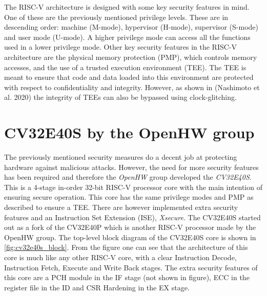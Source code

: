 The RISC-V architecture is designed with some key security features in mind. One of these are the previously mentioned privilege levels. These are in descending order: machine (M-mode), hypervisor (H-mode), supervisor (S-mode) and user mode (U-mode). A higher privilege mode can access all the functions used in a lower privilege mode\cite{source2}. Other key security features in the RISC-V architecture are the physical memory protection (PMP), which controls memory accesses, and the use of a trusted execution environment (TEE). The TEE is meant to ensure that code and data loaded into this environment are protected with respect to confidentiality and integrity. However, as shown in (Nashimoto et al. 2020) the integrity of TEEs can also be bypassed using clock-glitching\cite{source2}.

\section{CV32E40S by the OpenHW group}
\label{sec:cv32}

The previously mentioned security measures do a decent job at protecting hardware against malicious attacks. However, the need for more security features has been required and therefore the \textit{OpenHW} group developed the \textit{CV32E40S}. This is a 4-stage in-order 32-bit RISC-V processor core with the main intention of ensuring secure operation\cite{cv32e40s_manual}. This core has the same privilege modes and PMP as described to ensure a TEE. There are however implemented extra security features and an Instruction Set Extension (ISE), \textit{Xsecure}. The CV32E40S started out as a fork of the CV32E40P which is another RISC-V processor made by the OpenHW group. The top-level block diagram of the CV32E40S core is shown in \autoref{fig:cv32e40s_block}. From the figure one can see that the architecture of this core is much like any other RISC-V core, with a clear Instruction Decode, Instruction Fetch, Execute and Write Back stages. The extra security features of this core are a PCH module in the IF stage (not shown in figure), ECC in the register file in the ID and CSR Hardening in the EX stage. 


